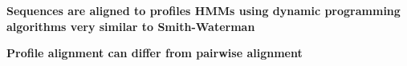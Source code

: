 \documentclass[landscape]{slides}
\begin{document}
\begin{slide}
\begin{center}
\textbf{Sequences are aligned to profiles HMMs using dynamic
  programming algorithms very similar to Smith-Waterman}
\end{center}


\vfill
\end{slide}
\begin{slide}
\begin{center}
\textbf{Profile alignment can differ from pairwise alignment}
\end{center}


\vfill
\end{slide}
\end{document}
